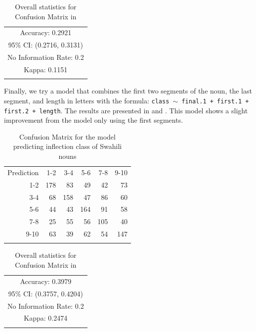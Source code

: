 \begin{table}
  \centering
  \begin{tabular}{lllrrr}
    \lsptoprule
    \multicolumn{6}{c}{Overall statistics:} \\
    \midrule
    \multicolumn{6}{c}{Accuracy: 0.2921}            \\
    \multicolumn{6}{c}{95\% CI: (0.2716, 0.3131)}   \\
    \multicolumn{6}{c}{No Information Rate: 0.2} \\
    \multicolumn{6}{c}{Kappa: 0.1151}               \\
    \lspbottomrule
  \end{tabular}
  \caption{Overall statistics for Confusion Matrix in }\label{tab:class-swa-last-stats}
\end{table}

Finally, we try a model that combines the first two segments of the noun, the last segment, and length in letters with the formula: \texttt{class $\sim$ final.1 + first.1 + first.2 + length}. The results are presented in  and . This model shows a slight improvement from the model only using the first segments.


\begin{table}
  \centering
  \begin{tabular}{rrrrrr}
    \lsptoprule
    \multicolumn{6}{c}{Reference}             \\
    \midrule
    Prediction & 1-2 & 3-4 & 5-6 & 7-8 & 9-10 \\
    1-2        & 178 & 83  & 49  & 42  & 73   \\
    3-4        & 68  & 158 & 47  & 86  & 60   \\
    5-6        & 44  & 43  & 164 & 91  & 58   \\
    7-8        & 25  & 55  & 56  & 105 & 40   \\
    9-10       & 63  & 39  & 62  & 54  & 147  \\
    \lspbottomrule
  \end{tabular}
  \caption{Confusion Matrix for the model predicting inflection class of Swahili nouns}\label{tab:class-swa-last-first}
\end{table}

\begin{table}
  \centering
  \begin{tabular}{lllrrr}
    \lsptoprule
    \multicolumn{6}{c}{Overall statistics:} \\
    \midrule
    \multicolumn{6}{c}{Accuracy: 0.3979}            \\
    \multicolumn{6}{c}{95\% CI: (0.3757, 0.4204)}   \\
    \multicolumn{6}{c}{No Information Rate: 0.2} \\
    \multicolumn{6}{c}{Kappa: 0.2474}               \\
    \lspbottomrule
  \end{tabular}
  \caption{Overall statistics for Confusion Matrix in }\label{tab:class-swa-last-first-stats}
\end{table}

